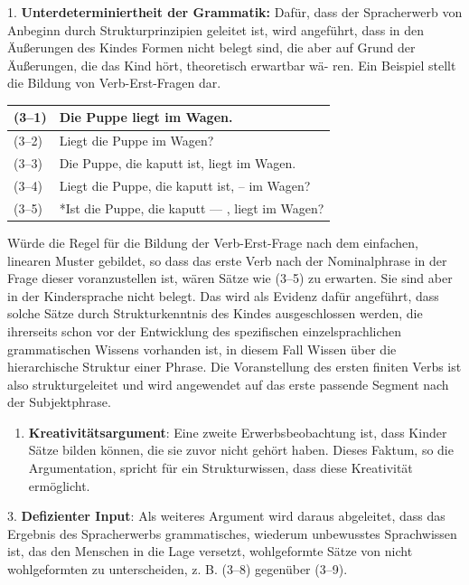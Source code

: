 \documentclass[
  letterpaper,
]{scrbook}
\providecommand{\tightlist}{%
  \setlength{\itemsep}{0pt}\setlength{\parskip}{0pt}}\usepackage{longtable,booktabs,array}
\begin{document}
1. \textbf{Unterdeterminiertheit der Grammatik:} Dafür, dass der
Spracherwerb von Anbeginn durch Strukturprinzipien geleitet ist, wird
angeführt, dass in den Äußerungen des Kindes Formen nicht belegt sind,
die aber auf Grund der Äußerungen, die das Kind hört, theoretisch
erwartbar wä- ren. Ein Beispiel stellt die Bildung von Verb-Erst-Fragen
dar.

\begin{longtable}[]{@{}ll@{}}
\toprule()
(3--1) & Die Puppe liegt im Wagen. \\
\midrule()
\endhead
(3--2) & Liegt die Puppe im Wagen? \\
(3--3) & Die Puppe, die kaputt ist, liegt im Wagen. \\
(3--4) & Liegt die Puppe, die kaputt ist, -- im Wagen? \\
(3--5) & *Ist die Puppe, die kaputt --- , liegt im Wagen? \\
\bottomrule()
\end{longtable}

Würde die Regel für die Bildung der Verb-Erst-Frage nach dem einfachen,
linearen Muster gebildet, so dass das erste Verb nach der Nominalphrase
in der Frage dieser voranzustellen ist, wären Sätze wie (3--5) zu
erwarten. Sie sind aber in der Kindersprache nicht belegt. Das wird als
Evidenz dafür angeführt, dass solche Sätze durch Strukturkenntnis des
Kindes ausgeschlossen werden, die ihrerseits schon vor der Entwicklung
des spezifischen einzelsprachlichen grammatischen Wissens vorhanden ist,
in diesem Fall Wissen über die hierarchische Struktur einer Phrase. Die
Voranstellung des ersten finiten Verbs ist also strukturgeleitet und
wird angewendet auf das erste passende Segment nach der Subjektphrase.\\

\begin{enumerate}
\def\labelenumi{\arabic{enumi}.}
\setcounter{enumi}{1}
\tightlist
\item
  \textbf{Kreativitätsargument}: Eine zweite Erwerbsbeobachtung ist,
  dass Kinder Sätze bilden können, die sie zuvor nicht gehört haben.
  Dieses Faktum, so die Argumentation, spricht für ein Strukturwissen,
  dass diese Kreativität ermöglicht.
\end{enumerate}

3. \textbf{Defizienter Input}: Als weiteres Argument wird daraus
abgeleitet, dass das Ergebnis des Spracherwerbs grammatisches, wiederum
unbewusstes Sprachwissen ist, das den Menschen in die Lage versetzt,
wohlgeformte Sätze von nicht wohlgeformten zu unterscheiden, z. B.
(3--8) gegenüber (3--9).
\end{document}
